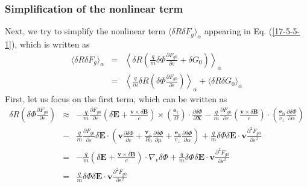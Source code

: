 \documentclass{article}
\newcommand{\tmmathbf}[1]{\ensuremath{\boldsymbol{#1}}}
\begin{document}
\subsubsection{Simplification of the nonlinear term}

Next, we try to simplify the nonlinear term $\langle \delta R \delta F_g
\rangle_{\alpha}$ appearing in Eq. (\ref{17-5-5-1}), which is written as
\begin{eqnarray}
  \langle \delta R \delta F_g \rangle_{\alpha} & = & \left\langle \delta R
  \left( \frac{q}{m} \delta \Phi \frac{\partial F_{g 0}}{\partial \varepsilon}
  + \delta G_0 \right) \right\rangle_{\alpha} \nonumber\\
  & = & \left\langle \frac{q}{m} \delta R \left( \delta \Phi \frac{\partial
  F_{g 0}}{\partial \varepsilon} \right) \right\rangle_{\alpha} + \langle
  \delta R \delta G_0 \rangle_{\alpha} 
\end{eqnarray}
First, let us focus on the first term, which can be written as
\begin{eqnarray}
  \delta R \left( \delta \Phi \frac{\partial F_{g 0}}{\partial \varepsilon}
  \right) & \approx & - \frac{q}{m} \frac{\partial F_{g 0}}{\partial
  \varepsilon} \left( \delta \mathbf{E}+ \frac{\mathbf{v} \times \delta
  \mathbf{B}}{c} \right) \times \left( \frac{\tmmathbf{e}_{\parallel}}{\Omega}
  \right) \cdot \frac{\partial \delta \Phi}{\partial \mathbf{X}} -
  \frac{q}{m} \frac{\partial F_{g 0}}{\partial \varepsilon} \left(
  \frac{\mathbf{v} \times \delta \mathbf{B}}{c} \right) \cdot \left(
  \frac{\tmmathbf{e}_{\alpha}}{v_{\perp}}  \frac{\partial \delta
  \Phi}{\partial \alpha} \right) \nonumber\\
  & - & \frac{q}{m}  \frac{\partial F_{g 0}}{\partial \varepsilon} \delta
  \mathbf{E} \cdot \left( \mathbf{v} \frac{\partial \delta \Phi}{\partial
  \varepsilon} + \frac{\mathbf{v}_{\perp}}{B_0}  \frac{\partial \delta
  \Phi}{\partial \mu} + \frac{\tmmathbf{e}_{\alpha}}{v_{\perp}} 
  \frac{\partial \delta \Phi}{\partial \alpha} \right) + \frac{q}{m} \delta
  \Phi \delta \mathbf{E} \cdot \mathbf{v} \frac{\partial^2 F_{g 0}}{\partial
  \varepsilon^2} \nonumber\\
  & = & - \frac{q}{m} \left( \delta \mathbf{E}+ \frac{\mathbf{v} \times
  \delta \mathbf{B}}{c} \right) \cdot \nabla_v \delta \Phi + \frac{q}{m}
  \delta \Phi \delta \mathbf{E} \cdot \mathbf{v} \frac{\partial^2 F_{g
  0}}{\partial \varepsilon^2} \nonumber\\
  & = & \frac{q}{m} \delta \Phi \delta \mathbf{E} \cdot \mathbf{v}
  \frac{\partial^2 F_{g 0}}{\partial \varepsilon^2} 
\end{eqnarray}
\end{document}

